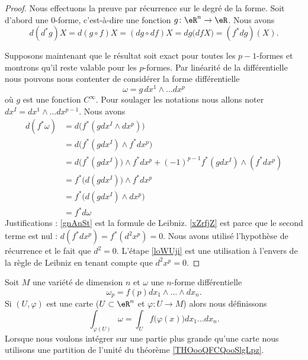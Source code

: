 \begin{proof}
	Nous effectuons la preuve par récurrence sur le degré de la forme. Soit d'abord une \( 0\)-forme, c'est-à-dire une fonction \( g\colon \eR^n\to \eR\). Nous avons
	\begin{equation}
		d(d^*g)X=d(g\circ f)X=(dg\circ df)X=dg\big( df X \big)=(f^*dg)(X).
	\end{equation}

	Supposons maintenant que le résultat soit exact pour toutes les \( p-1\)-formes et montrons qu'il reste valable pour les \( p\)-formes. Par linéarité de la différentielle nous pouvons nous contenter de considérer la forme différentielle
	\begin{equation}
		\omega=g\,dx^1\wedge\ldots dx^p
	\end{equation}
	où \( g\) est une fonction \(  C^{\infty}\). Pour soulager les notations nous allons noter \( dx^I=dx^1\wedge\ldots dx^{p-1}\). Nous avons
	\begin{subequations}
		\begin{align}
			d(f^*\omega) & =d\big( f^*(gdx^I\wedge dx^p) \big)                                                       \\
			             & =d\big( f^*(gdx^I)\wedge f^*dx^p \big)                                                    \\
			             & =d\big( f^*(gdx^I)\big)\wedge f^*dx^p+(-1)^{p-1}f^*(gdx^I)\wedge(f^*dx^p)  \label{gnAnSt} \\
			             & =f^*\big( d(gdx^I) \big)\wedge f^*dx^p      \label{xZrfjZ}                                \\
			             & =f^*\big( d(gdx^I)\wedge dx^p \big)                                                       \\
			             & =f^*d\omega        \label{loWUji}
		\end{align}
	\end{subequations}
	Justifications : \eqref{gnAnSt} est la formule de Leibniz. \eqref{xZrfjZ} est parce que le second terme est nul : \( d(f^*dx^p)=f^*(d^2x^p)=0\). Nous avons utilisé l'hypothèse de récurrence et le fait que \( d^2=0\). L'étape \eqref{loWUji} est une utilisation à l'envers de la règle de Leibniz en tenant compte que \( d^2x^p=0\).
\end{proof}


Soit \( M\) une variété de dimension \( n\) et \( \omega\) une \( n\)-forme différentielle
\begin{equation}
	\omega_p=f(p)dx_1\wedge\ldots\wedge dx_n.
\end{equation}
Si \( (U,\varphi)\) est une carte (\( U\subset\eR^n\) et \( \varphi\colon U\to M\)) alors nous définissons
\begin{equation}
	\int_{\varphi(U)}\omega=\int_{U}f\big( \varphi(x) \big)dx_1\ldots dx_n.
\end{equation}
Lorsque nous voulons intégrer sur une partie plus grande qu'une carte nous utilisons une partition de l'unité du théorème \ref{THOooQFCQooSlgLpz}.


